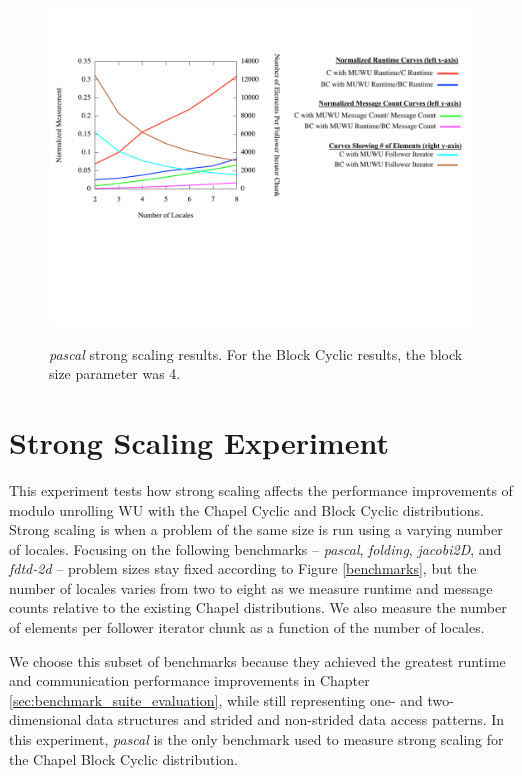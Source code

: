 \begin{figure}
\begin{center}
\includegraphics[width=\linewidth]{./Figures/strong_scaling/pascal.pdf}
\renewcommand{\baselinestretch}{1}
\small\normalsize
\begin{quote}
\caption[\textit{pascal} strong scaling results]{\textit{pascal} strong scaling results. For the Block Cyclic results, the block size parameter was 4.\label{pascal_strong_scaling}}
\end{quote}
\end{center}
\end{figure}

\section{Strong Scaling Experiment}\label{sec:strong_scaling}

This experiment tests how strong scaling affects the performance improvements of modulo unrolling WU with the Chapel Cyclic and Block Cyclic distributions. Strong scaling is when a problem of the same size is run using a varying number of locales. Focusing on the following benchmarks -- \textit{pascal}, \textit{folding}, \textit{jacobi2D}, and \textit{fdtd-2d} -- problem sizes stay fixed according to Figure \ref{benchmarks}, but the number of locales varies from two to eight as we measure runtime and message counts relative to the existing Chapel distributions. We also measure the number of elements per follower iterator chunk as a function of the number of locales. 

We choose this subset of benchmarks because they achieved the greatest runtime and communication performance improvements in Chapter \ref{sec:benchmark_suite_evaluation}, while still representing one- and two-dimensional data structures and strided and non-strided data access patterns. In this experiment, \textit{pascal} is the only benchmark used to measure strong scaling for the Chapel Block Cyclic distribution. 

